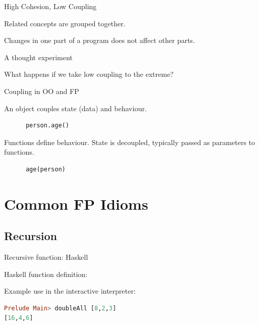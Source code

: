 \documentclass{beamer}
\begin{document}
\begin{frame}{High Cohesion, Low Coupling}

  \begin{description}[<+->]
  \item[High Cohesion] Related concepts are grouped together.
  \item[Low Coupling] Changes in one part of a program does not
    affect other parts.
  \end{description}
\end{frame}

\begin{frame}{A thought experiment}

  {\Huge What happens if we take low coupling to the extreme?}

\end{frame}

\begin{frame}[fragile]{Coupling in OO and FP}

  \begin{description}[<+->]
  \item[OO] An object couples state (data) and behaviour.
    \begin{lstlisting}
      person.age()
    \end{lstlisting}
  \item[FP] Functions define behaviour. State is decoupled, typically
    passed as parameters to functions.
    \begin{lstlisting}
      age(person)
    \end{lstlisting}
  \end{description}

\end{frame}

\section{Common FP Idioms}
\subsection{Recursion}

\begin{frame}[fragile]{Recursive function: Haskell}

Haskell function definition:
  

Example use in the interactive interpreter:
  \begin{lstlisting}[language=Haskell]
Prelude Main> doubleAll [8,2,3]
[16,4,6]
  \end{lstlisting}

\end{frame}
\end{document}
